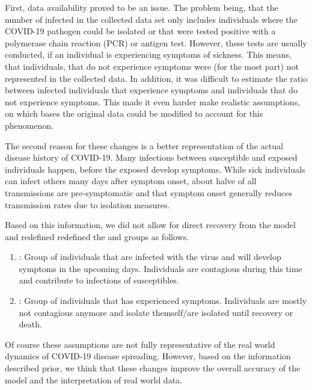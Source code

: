 \par
First, data availability proved to be an issue. The problem being, that the number of infected in the
collected data set only includes individuals where the COVID-19 pathogen could be isolated or that were tested positive
with a polymerase chain reaction (PCR) or antigen test\cite{RKIcase}. However,
these tests are usually conducted, if an individual is experiencing symptoms of sickness. This means, that individuals, that do
not experience symptoms were (for the most part) not represented in the collected data. In addition, it was difficult to estimate
the ratio between infected individuals that experience symptoms and individuals that do not experience symptoms. This made it
even harder make realistic assumptions, on which bases the original data could be modified to account for this phenomenon.\newline

\par
The second reason for these changes is a better representation of the actual disease history of COVID-19. Many infections
between susceptible and exposed individuals happen, before the exposed develop symptoms. While sick individuals can infect others many
days after symptom onset, about halve of all transmissions are pre-symptomatic \cite{casey2021presymptomatic} and that symptom onset generally
reduces transmission rates due to isolation measures\cite{RKIcov}.

\par
Based on this information, we did not allow for direct recovery from the model and redefined redefined the  and  groups as follows.
\begin{enumerate}[label=$\bullet$]
	\item {}: Group of individuals that are infected with the virus and will develop symptoms in the upcoming
		days. Individuals are contagious during this time and contribute to infections of susceptibles.
	\item {}: Group of individuals that has experienced symptoms. Individuals are mostly not contagious anymore
		and isolate themself/are isolated until recovery or death.
\end{enumerate}

Of course these assumptions are not fully representative of the real world dynamics of COVID-19 disease spreading. However, based on
the information described prior, we think that these changes improve the overall accuracy of the model and the interpretation of real world data.


